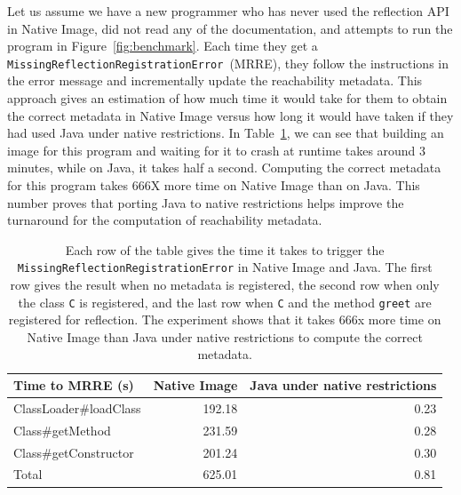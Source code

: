 Let us assume we have a new programmer who has never used the reflection API in Native Image, did not read any of the documentation, and attempts to run the program in Figure~\ref{fig:benchmark}. Each time they get a \verb|MissingReflectionRegistrationError|~(MRRE), they follow the instructions in the error message and incrementally update the reachability metadata.
This approach gives an estimation of how much time it would take for them to obtain the correct metadata in Native Image versus how long it would have taken if they had used Java under native restrictions. 
In Table~\ref{tab:benchmark}, we can see that building an image for this program and waiting for it to crash at runtime takes around 3 minutes, while on Java, it takes half a second. Computing the correct metadata for this program takes 666X more time on Native Image than on Java.
This number proves that porting Java to native restrictions helps improve the turnaround for the computation of reachability metadata.

\begin{table}[ht]
\centering
\begin{tabular}{@{}lrr@{}}
\toprule
Time to MRRE (s) & \multicolumn{1}{l}{Native Image} & \multicolumn{1}{l}{Java under native restrictions} \\ \midrule
ClassLoader\#loadClass          & 192.18 & 0.23 \\
Class\#getMethod                & 231.59 & 0.28 \\
Class\#getConstructor           & 201.24 & 0.30 \\ \midrule
Total                           & 625.01 & 0.81 \\ \bottomrule
\end{tabular}
\caption{Each row of the table gives the time it takes to trigger the \texttt{MissingReflectionRegistrationError} in Native Image and Java. The first row gives the result when no metadata is registered, the second row when only the class \texttt{C} is registered, and the last row when \texttt{C} and the method \texttt{greet} are registered for reflection. The experiment shows that it takes 666x more time on Native Image than Java under native restrictions to compute the correct metadata.}
\label{tab:benchmark}
\end{table}
